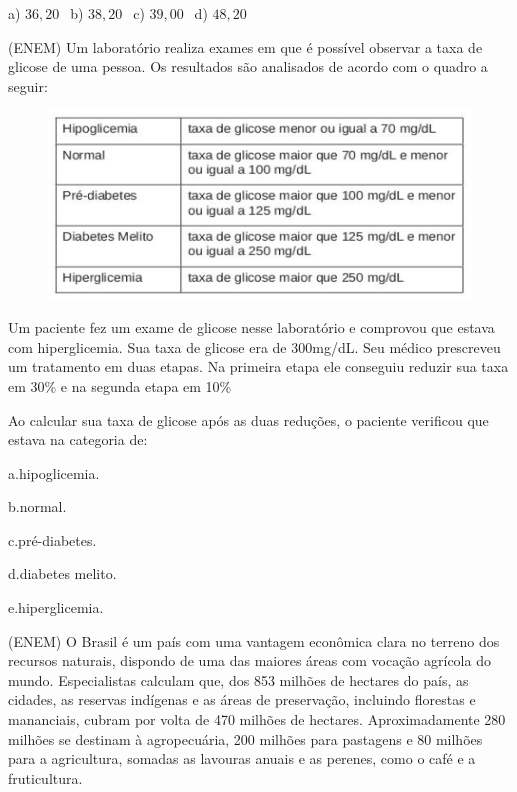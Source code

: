 \begin{multicols*}{2}
		      a) $36,20 \ \ $ b) $38,20 \ \ $ c) $39,00 \ \ $ d) $48,20 $

		\execnum (ENEM) Um laboratório realiza exames em que é possível observar a taxa de glicose de uma pessoa. Os
		      resultados são analisados de acordo com o quadro a seguir:

		      \begin{figure}[H]
			      \centering
			      \includegraphics[width=\columnwidth]{assets/glicemia.png}
		      \end{figure}

		      Um paciente fez um exame de glicose nesse laboratório e comprovou que estava com hiperglicemia. Sua taxa de
		      glicose era de 300mg/dL. Seu médico prescreveu um tratamento em duas etapas. Na primeira etapa ele
		      conseguiu reduzir sua taxa em 30\% e na segunda etapa em 10\%

		      Ao calcular sua taxa de glicose após as duas reduções, o paciente verificou que estava na categoria de:

		      a.hipoglicemia.

		      b.normal.

		      c.pré-diabetes.

		      d.diabetes melito.

		      e.hiperglicemia.


		\execnum (ENEM) O Brasil é um país com uma vantagem econômica clara no terreno dos recursos naturais, dispondo de uma das maiores áreas com vocação agrícola do mundo. Especialistas calculam que, dos 853 milhões de hectares do país, as cidades, as reservas indígenas e as áreas de preservação, incluindo florestas e mananciais, cubram por volta de 470 milhões de hectares. Aproximadamente 280 milhões se destinam à agropecuária, 200 milhões para pastagens e 80 milhões para a agricultura, somadas as lavouras anuais e as perenes, como o café e a fruticultura.


\end{multicols*}

